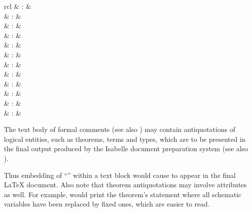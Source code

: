 \begin{isabellebody}
\begin{isamarkuptext}
\begin{matharray}{rcl}
    \mbox{} & : & \isarantiq \\
    \mbox{} & : & \isarantiq \\
    \mbox{} & : & \isarantiq \\
    \mbox{} & : & \isarantiq \\
    \mbox{} & : & \isarantiq \\
    \mbox{} & : & \isarantiq \\
    \mbox{} & : & \isarantiq \\
    \mbox{} & : & \isarantiq \\
    \mbox{} & : & \isarantiq \\
    \mbox{} & : & \isarantiq \\
    \mbox{} & : & \isarantiq \\
    \mbox{} & : & \isarantiq \\
  \end{matharray}

  The text body of formal comments (see also )
  may contain antiquotations of logical entities, such as theorems,
  terms and types, which are to be presented in the final output
  produced by the Isabelle document preparation system (see also
  ).

  Thus embedding of ``''
  within a text block would cause
   to appear in the final {\LaTeX} document.  Also note that theorem
  antiquotations may involve attributes as well.  For example,
   would print the theorem's
  statement where all schematic variables have been replaced by fixed
  ones, which are easier to read.


\end{isamarkuptext}
\end{isabellebody}
